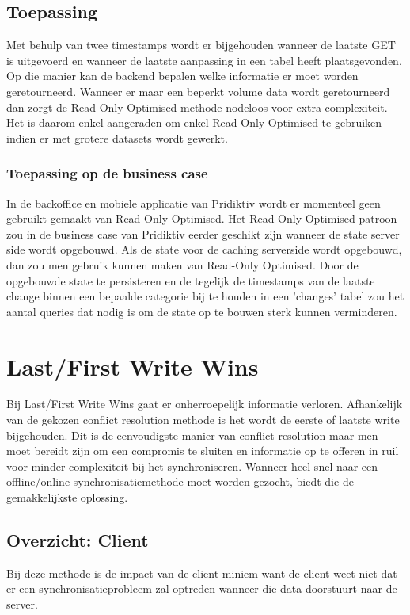 \subsection{Toepassing}
Met behulp van twee timestamps wordt er bijgehouden wanneer de laatste GET is uitgevoerd en wanneer de laatste aanpassing in een tabel heeft plaatsgevonden. Op die manier kan de backend bepalen welke informatie er moet worden geretourneerd. Wanneer er maar een beperkt volume data wordt geretourneerd dan zorgt de Read-Only Optimised methode nodeloos voor extra complexiteit. Het is daarom enkel aangeraden om enkel Read-Only Optimised te gebruiken indien er met grotere datasets wordt gewerkt.
\subsubsection{Toepassing op de business case}
In de backoffice en mobiele applicatie van Pridiktiv wordt er momenteel geen gebruikt gemaakt van Read-Only Optimised. Het Read-Only Optimised patroon zou in de business case van Pridiktiv eerder geschikt zijn wanneer de state server side wordt opgebouwd. Als de state voor de caching serverside wordt opgebouwd, dan zou men gebruik kunnen maken van Read-Only Optimised. Door de opgebouwde state te persisteren en de tegelijk  de timestamps van de laatste change binnen een bepaalde categorie bij te houden in een 'changes' tabel zou het aantal queries dat nodig is om de state op te bouwen sterk kunnen verminderen. 

\section{Last/First Write Wins}
Bij Last/First Write Wins gaat er onherroepelijk informatie verloren. Afhankelijk van de gekozen conflict resolution methode is het wordt de eerste of laatste write bijgehouden. Dit is de eenvoudigste manier van conflict resolution maar men moet bereidt zijn om een compromis te sluiten en informatie op te offeren in ruil voor minder complexiteit bij het synchroniseren. Wanneer heel snel naar een offline/online synchronisatiemethode moet worden gezocht, biedt die de gemakkelijkste oplossing.
\subsection{Overzicht: Client}
Bij deze methode is de impact van de client miniem want de client weet niet dat er een synchronisatieprobleem zal optreden wanneer die data doorstuurt naar de server.
